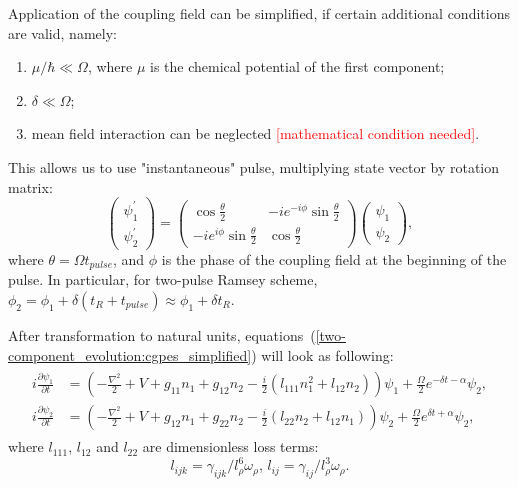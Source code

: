 \documentclass[12pt,notitlepage]{report}
\begin{document}
Application of the coupling field can be simplified, if certain additional conditions are valid, namely:
\begin{enumerate}
\item $\mu / \hbar \ll \Omega$, where $\mu$ is the chemical potential of the first component;
\item $\delta \ll \Omega$;
\item mean field interaction can be neglected \textcolor{red}{[mathematical condition needed]}.
\end{enumerate}
This allows us to use "instantaneous" pulse, multiplying state vector by rotation matrix:
\begin{equation}
\label{rotation_matrix}
\begin{pmatrix}
	\psi^\prime_1 \\	\psi^\prime_2
\end{pmatrix} =
\begin{pmatrix}
	\cos \frac{\theta}{2} & -i e^{-i \phi} \sin \frac{\theta}{2} \\ -i e^{i \phi} \sin \frac{\theta}{2} & \cos \frac{\theta}{2}
\end{pmatrix}
\begin{pmatrix}
	\psi_1 \\ \psi_2
\end{pmatrix},
\end{equation}
where $\theta = \Omega t_{pulse}$, and $\phi$ is the phase of the coupling field at the beginning of the pulse.
In particular, for two-pulse Ramsey scheme, $\phi_2 = \phi_1 + \delta (t_{R} + t_{pulse}) \approx \phi_1 + \delta t_{R}$.

After transformation to natural units, equations~(\ref{two-component_evolution:cgpes_simplified}) will look as following:
\begin{align}
\label{two-component_evolution:cgpes_natural}
\begin{split}
i \frac{\partial \psi_1}{\partial t} & = \left(
	-\frac{\nabla^2}{2} + V + g_{11} n_1 + g_{12} n_2 - \frac{i}{2} (l_{111} n_1^2 + l_{12} n_2)
\right) \psi_1 +
\frac{\Omega}{2} e^{- \delta t - \alpha} \psi_2, \\
i \frac{\partial \psi_2}{\partial t} & = \left(
	-\frac{\nabla^2}{2} + V + g_{12} n_1 + g_{22} n_2 - \frac{i}{2} (l_{22} n_2 + l_{12} n_1)
\right) \psi_2 +
\frac{\Omega}{2} e^{\delta t + \alpha} \psi_2,
\end{split}
\end{align}
where $l_{111}$, $l_{12}$ and $l_{22}$ are dimensionless loss terms:
\[ l_{ijk} = \gamma_{ijk} / l_\rho^6 \omega_{\rho},\, l_{ij} = \gamma_{ij} / l_\rho^3 \omega_{\rho}. \]
\end{document}
